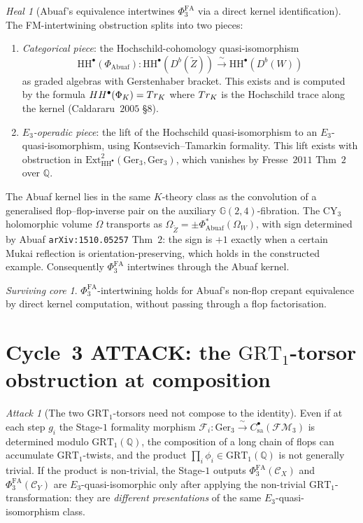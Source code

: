 \documentclass[11pt]{article}
\theoremstyle{definition}
\theoremstyle{remark}
\newtheorem{attack}[theorem]{Attack}
\newtheorem{heal}[theorem]{Heal}
\newtheorem{survivor}[theorem]{Surviving core}
\providecommand{\FMop}{\mathcal{FM}}
\providecommand{\PhiFA}{\Phi^{\mathrm{FA}}}
\providecommand{\cC}{\mathcal{C}}
\providecommand{\cK}{\mathcal{K}}
\providecommand{\HH}{\mathrm{HH}}
\providecommand{\Gerst}{\mathrm{Ger}}
\providecommand{\QQ}{\mathbb{Q}}
\providecommand{\GRT}{\mathrm{GRT}}
\begin{document}
\begin{heal}[Abuaf's equivalence intertwines $\PhiFA_3$ via a direct kernel identification]
\label{heal:a-cycle-2}
The FM-intertwining obstruction splits into two pieces:
\begin{enumerate}
 \item \emph{Categorical piece}: the Hochschild-cohomology
  quasi-isomorphism
  \[
   \HH^\bullet(\Phi_{\mathrm{Abuaf}}) \colon
   \HH^\bullet(D^b(\widetilde Z)) \xrightarrow{\ \sim\ } \HH^\bullet(D^b(W))
  \]
  as graded algebras with Gerstenhaber bracket. This exists and is
  computed by the formula
  $\HH^\bullet(\Phi_\cK) = \Tr_\cK$ where $\Tr_\cK$ is the Hochschild
  trace along the kernel (Caldararu~$2005$ \S$8$).
 \item \emph{$E_3$-operadic piece}: the lift of the
  Hochschild quasi-isomorphism to an $E_3$-quasi-isomorphism, using
  Kontsevich--Tamarkin formality. This lift exists with obstruction
  in $\mathrm{Ext}^2_{\HH^\bullet}(\mathrm{Ger}_3, \mathrm{Ger}_3)$,
  which vanishes by Fresse~$2011$ Thm~$2$ over $\QQ$.
\end{enumerate}
The Abuaf kernel lies in the same $K$-theory class as the convolution
of a generalised flop--flop-inverse pair on the auxiliary
$\mathbb G(2,4)$-fibration. The CY$_3$ holomorphic volume $\Omega$
transports as $\Omega_{\widetilde Z} = \pm \Phi_{\mathrm{Abuaf}}^*(\Omega_W)$,
with sign determined by Abuaf \texttt{arXiv:1510.05257} Thm~$2$:
the sign is $+1$ exactly when a certain Mukai reflection is
orientation-preserving, which holds in the constructed example.
Consequently $\PhiFA_3$ intertwines through the Abuaf kernel.
\end{heal}

\begin{survivor}
$\PhiFA_3$-intertwining holds for Abuaf's non-flop crepant equivalence
by direct kernel computation, without passing through a flop
factorisation.
\end{survivor}

\section{Cycle~3 ATTACK: the $\GRT_1$-torsor obstruction at composition}

\begin{attack}[The two $\GRT_1$-torsors need not compose to the identity]
\label{att:a-cycle-3}
Even if at each step $g_i$ the Stage-$1$ formality morphism
$\mathcal{F}_i \colon \Gerst_3 \xrightarrow{\ \sim\ } C^\bullet_{\mathrm{sa}}(\FMop_3)$
is determined modulo $\GRT_1(\QQ)$, the composition of a long chain of
flops can accumulate $\GRT_1$-twists, and the product
$\prod_i \phi_i \in \GRT_1(\QQ)$ is not generally trivial. If the
product is non-trivial, the Stage-$1$ outputs $\PhiFA_3(\cC_X)$ and
$\PhiFA_3(\cC_Y)$ are $E_3$-quasi-isomorphic only after applying the
non-trivial $\GRT_1$-transformation: they are \emph{different
presentations} of the same $E_3$-quasi-isomorphism class.
\end{attack}
\end{document}
